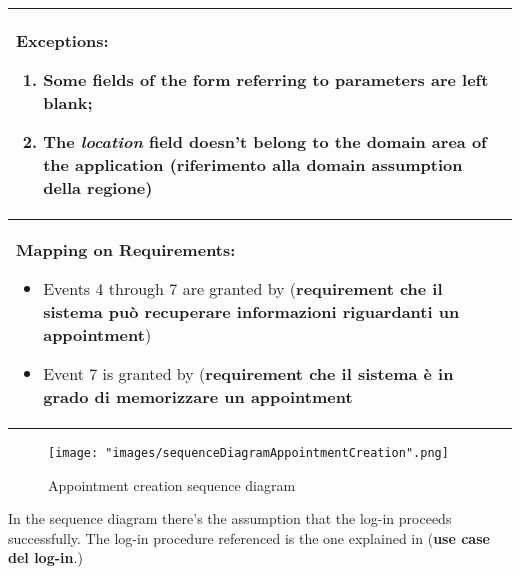 \begin{longtable}{|p{14cm}|}
\textbf{Exceptions:}
\begin{enumerate}
\item Some fields of the form referring to parameters are left blank;
\item The \textit{location} field doesn't belong to the domain area of the application (\textbf{riferimento alla domain assumption della regione})
\end{enumerate} \\ \hline
\textbf{Mapping on Requirements:}
\begin{itemize}
\item Events 4 through 7 are granted by (\textbf{requirement che il sistema può recuperare informazioni riguardanti un appointment})
\item Event 7 is granted by (\textbf{requirement che il sistema è in grado di memorizzare un appointment}
\end{itemize}  \\ \hline


\end{longtable}

\begin{figure}[H]
\begin{center}
\texttt{[image: "images/sequenceDiagramAppointmentCreation".png]}
\caption{Appointment creation sequence diagram}
\label{img:seqDiagrAppCreation}
\end{center}
\end{figure}

In the sequence diagram there's the assumption that the log-in proceeds successfully. The log-in procedure referenced is the one explained in (\textbf{use case del log-in}.)

